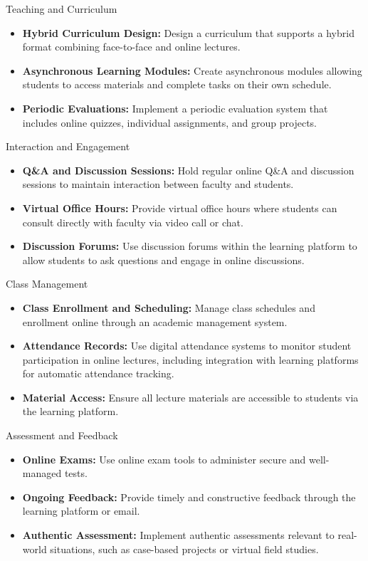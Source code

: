 \documentclass[aspectratio=169, table]{beamer}
\begin{document}
\begin{frame}{Teaching and Curriculum}
	\begin{itemize}
		\item \textbf{Hybrid Curriculum Design:} Design a curriculum that supports a hybrid format combining face-to-face and online lectures.
		\item \textbf{Asynchronous Learning Modules:} Create asynchronous modules allowing students to access materials and complete tasks on their own schedule.
		\item \textbf{Periodic Evaluations:} Implement a periodic evaluation system that includes online quizzes, individual assignments, and group projects.
	\end{itemize}
\end{frame}

\begin{frame}{Interaction and Engagement}
	\begin{itemize}
		\item \textbf{Q\&A and Discussion Sessions:} Hold regular online Q\&A and discussion sessions to maintain interaction between faculty and students.
		\item \textbf{Virtual Office Hours:} Provide virtual office hours where students can consult directly with faculty via video call or chat.
		\item \textbf{Discussion Forums:} Use discussion forums within the learning platform to allow students to ask questions and engage in online discussions.
	\end{itemize}
\end{frame}

\begin{frame}{Class Management}
	\begin{itemize}
		\item \textbf{Class Enrollment and Scheduling:} Manage class schedules and enrollment online through an academic management system.
		\item \textbf{Attendance Records:} Use digital attendance systems to monitor student participation in online lectures, including integration with learning platforms for automatic attendance tracking.
		\item \textbf{Material Access:} Ensure all lecture materials are accessible to students via the learning platform.
	\end{itemize}
\end{frame}

\begin{frame}{Assessment and Feedback}
	\begin{itemize}
		\item \textbf{Online Exams:} Use online exam tools to administer secure and well-managed tests.
		\item \textbf{Ongoing Feedback:} Provide timely and constructive feedback through the learning platform or email.
		\item \textbf{Authentic Assessment:} Implement authentic assessments relevant to real-world situations, such as case-based projects or virtual field studies.
	\end{itemize}
\end{frame}
\end{document}
